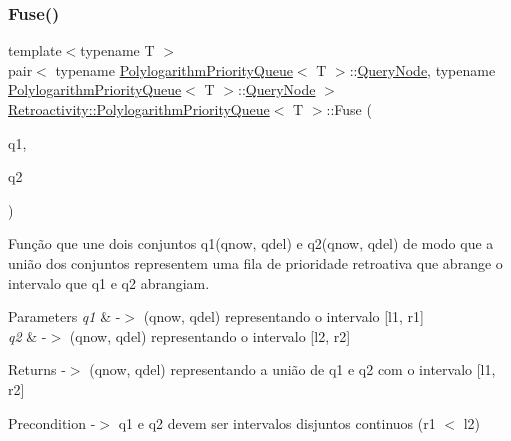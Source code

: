 \subsubsection{\texorpdfstring{Fuse()}{Fuse()}}
{\footnotesize\ttfamily template$<$typename T $>$ \\
pair$<$ typename \hyperlink{classRetroactivity_1_1PolylogarithmPriorityQueue}{Polylogarithm\+Priority\+Queue}$<$ T $>$\+::\hyperlink{classRetroactivity_1_1PolylogarithmPriorityQueue_1_1QueryNode}{Query\+Node}, typename \hyperlink{classRetroactivity_1_1PolylogarithmPriorityQueue}{Polylogarithm\+Priority\+Queue}$<$ T $>$\+::\hyperlink{classRetroactivity_1_1PolylogarithmPriorityQueue_1_1QueryNode}{Query\+Node} $>$ \hyperlink{classRetroactivity_1_1PolylogarithmPriorityQueue}{Retroactivity\+::\+Polylogarithm\+Priority\+Queue}$<$ T $>$\+::Fuse (\begin{DoxyParamCaption}\item[{pair$<$ \hyperlink{classRetroactivity_1_1PolylogarithmPriorityQueue_1_1QueryNode}{Query\+Node}, \hyperlink{classRetroactivity_1_1PolylogarithmPriorityQueue_1_1QueryNode}{Query\+Node} $>$}]{q1,  }\item[{pair$<$ \hyperlink{classRetroactivity_1_1PolylogarithmPriorityQueue_1_1QueryNode}{Query\+Node}, \hyperlink{classRetroactivity_1_1PolylogarithmPriorityQueue_1_1QueryNode}{Query\+Node} $>$}]{q2 }\end{DoxyParamCaption})}

Função que une dois conjuntos q1(qnow, qdel) e q2(qnow, qdel) de modo que a união dos conjuntos representem uma fila de prioridade retroativa que abrange o intervalo que q1 e q2 abrangiam.


\begin{DoxyParams}{Parameters}
{\em q1} & -\/$>$ (qnow, qdel) representando o intervalo \mbox{[}l1, r1\mbox{]} \\
\hline
{\em q2} & -\/$>$ (qnow, qdel) representando o intervalo \mbox{[}l2, r2\mbox{]} \\
\hline
\end{DoxyParams}
\begin{DoxyReturn}{Returns}
-\/$>$ (qnow, qdel) representando a união de q1 e q2 com o intervalo \mbox{[}l1, r2\mbox{]} 
\end{DoxyReturn}
\begin{DoxyPrecond}{Precondition}
-\/$>$ q1 e q2 devem ser intervalos disjuntos continuos (r1 $<$ l2) 
\end{DoxyPrecond}
\mbox{\label{classRetroactivity_1_1PolylogarithmPriorityQueue_a2ad9a9b51b4be420f0c5a65f6bcc3e41}} 

